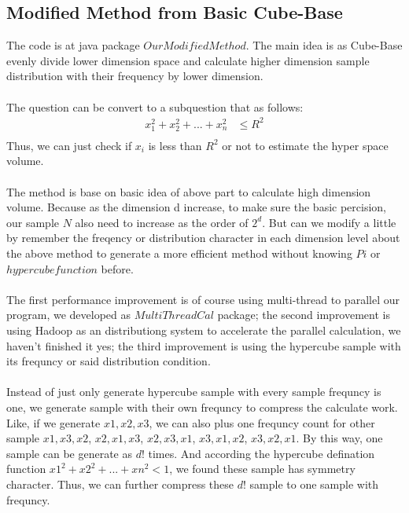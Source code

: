 \documentclass{article}
\begin{document}
		\subsection*{Modified Method from Basic Cube-Base}
		\label{subsec:mm}
		The code is at java package $OurModifiedMethod$. The main idea is as Cube-Base evenly divide lower dimension space and calculate higher dimension sample distribution with their frequency by lower dimension.
		\\
		\\
		The question can be convert to a subquestion that  as follows:
		\begin{equation*}
		\begin{split}
			x_{1}^{2} + x_{2}^{2} + ... + x_{n}^{2} &\leq R^{2}\\
		\end{split}
		\end{equation*}
		Thus, we can just check if $x_i$ is less than $R^{2}$ or not to estimate the hyper space volume.
		\\
		\\
		The method is base on basic idea of above part to calculate high dimension volume. Because as the dimension d increase, to make sure the basic percision, our sample $N$ also need to increase as the order of $2^d$. But can we modify a little by remember the freqency or distribution character in each dimension level about the above method to generate a more efficient method without knowing $Pi$ or $hypercube function$ before.
		\\
		\\
		The first performance improvement is of course using multi-thread to parallel our program, we developed as $MultiThreadCal$ package; the second improvement is using Hadoop as an distributiong system to accelerate the parallel calculation, we haven't finished it yes; the third improvement is using the hypercube sample with its frequncy or said distribution condition.
		\\
		\\
		Instead of just only generate hypercube sample with every sample frequncy is one, we generate sample with their own frequncy to compress the calculate work. Like, if we generate $x1, x2, x3$, we can also plus one frequncy count for other sample $x1, x3, x2$, $x2, x1, x3$, $x2, x3, x1$, $x3, x1, x2$, $x3, x2, x1$. By this way, one sample can be generate as $d!$ times. And according the hypercube defination function ${x1}^2 + {x2}^2 + ... + {xn}^2 < 1$, we found these sample has symmetry character. Thus, we can further compress these $d!$ sample to one sample with frequncy. 
\end{document}

